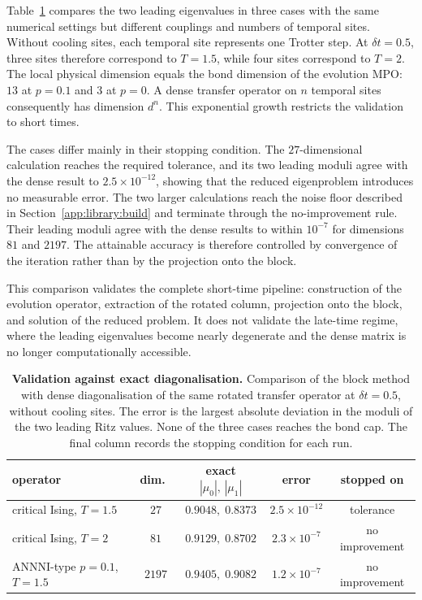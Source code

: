 Table~\ref{tab:blockpm_validation} compares the two leading eigenvalues in three cases with the same numerical settings but different couplings and numbers of temporal sites. Without cooling sites, each temporal site represents one Trotter step. At $\delta t=0.5$, three sites therefore correspond to $T=1.5$, while four sites correspond to $T=2$. The local physical dimension equals the bond dimension of the evolution \ac{MPO}: $13$ at $p=0.1$ and $3$ at $p=0$. A dense transfer operator on $n$ temporal sites consequently has dimension $d^n$. This exponential growth restricts the validation to short times.

The cases differ mainly in their stopping condition. The $27$-dimensional calculation reaches the required tolerance, and its two leading moduli agree with the dense result to $2.5\times10^{-12}$, showing that the reduced eigenproblem introduces no measurable error. The two larger calculations reach the noise floor described in Section~\ref{app:library:build} and terminate through the no-improvement rule. Their leading moduli agree with the dense results to within $10^{-7}$ for dimensions $81$ and $2197$. The attainable accuracy is therefore controlled by convergence of the iteration rather than by the projection onto the block.

This comparison validates the complete short-time pipeline: construction of the evolution operator, extraction of the rotated column, projection onto the block, and solution of the reduced problem. It does not validate the late-time regime, where the leading eigenvalues become nearly degenerate and the dense matrix is no longer computationally accessible.

\begin{table}[htbp]
  \centering
  \begin{tabular}{lcccc}
    \hline
    operator                    & dim.\  & exact $|\mu_0|,\,|\mu_1|$ & error               & stopped on     \\
    \hline
    critical Ising, $T=1.5$     & $27$   & $0.9048,\;0.8373$         & $2.5\times10^{-12}$ & tolerance      \\
    critical Ising, $T=2$       & $81$   & $0.9129,\;0.8702$         & $2.3\times10^{-7}$  & no improvement \\
    ANNNI-type $p=0.1$, $T=1.5$ & $2197$ & $0.9405,\;0.9082$         & $1.2\times10^{-7}$  & no improvement \\
    \hline
  \end{tabular}
  \caption{\textbf{Validation against exact diagonalisation.} Comparison of the block method with dense diagonalisation of the same rotated transfer operator at $\delta t=0.5$, without cooling sites. The error is the largest absolute deviation in the moduli of the two leading Ritz values. None of the three cases reaches the bond cap. The final column records the stopping condition for each run.}
  \label{tab:blockpm_validation}
\end{table}
